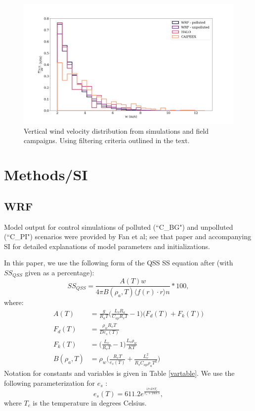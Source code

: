 \documentclass{article}
\begin{document}
\begin{figure}[ht]
    \centering
    \includegraphics[width=12cm]{revmywrf/v1_FINAL_combined_w_hist_figure.png}
    \caption{Vertical wind velocity distribution from simulations and field campaigns. Using filtering criteria outlined in the text.}
    \label{combinedwhist}
\end{figure}

\section{Methods/SI}

\subsection{WRF}

Model output for control simulations of polluted (``C\_BG") and unpolluted (``C\_PI") scenarios were provided by Fan et al; see that paper and accompanying SI for detailed explanations of model parameters and initializations.

In this paper, we use the following form of the QSS SS equation after \cite{Rogers1989} (with $SS_{QSS}$ given as a percentage):
\begin{equation}
\label{fullss}
SS_{QSS} = \frac{A(T) w}{4\pi B(\rho_a, T) \langle f(r)\cdot r\rangle n}*100,
\end{equation}
where:
\begin{align}
A(T) &= \frac{g}{R_a T}\Big(\frac{L_v R_a}{C_{ap} R_v T} - 1\Big)\big(F_d(T) + F_k(T)\big)\nonumber\\
F_d(T) &= \frac{\rho_w R_v T}{D e_s(T)}\nonumber\\
F_k(T) &= \Big(\frac{L_v}{R_v T} - 1\Big)\frac{L_v \rho_w}{K T}\nonumber\\
B(\rho_a, T) &= \rho_w\Big(\frac{R_v T}{e_s(T)} + \frac{L_v^2}{R_v C_{ap} \rho_a T^2}\Big)
\end{align}
Notation for constants and variables is given in Table \ref{vartable}. We use the following parameterization for $e_s$ \cite{Rogers1989}:
\begin{equation}
e_s(T) = 611.2e^{\frac{17.67T_c}{T_c + 243.5}},
\end{equation}
where $T_c$ is the temperature in degrees Celsius.
\end{document}
